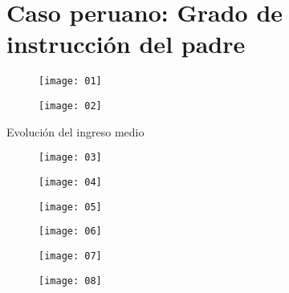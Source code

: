 \documentclass[11.5 pt]{beamer}
\begin{document}
\section{Caso peruano: Grado de instrucción del padre}
\begin{frame}
	\begin{figure}
		\centering
		\texttt{[image: 01]}
	\end{figure}
\end{frame}


\begin{frame}
	\begin{figure}
		\texttt{[image: 02]}
	\end{figure}
\end{frame}


\begin{frame}{Evolución del ingreso medio}
	\begin{figure}
		\centering
		\texttt{[image: 03]}
	\end{figure}
\end{frame}


\begin{frame}
	\begin{figure}
		\texttt{[image: 04]}
	\end{figure}
\end{frame}


\begin{frame}
	\begin{figure}
		\texttt{[image: 05]}
	\end{figure}
\end{frame}


\begin{frame}
	\begin{figure}
		\texttt{[image: 06]}
	\end{figure}
\end{frame}

\begin{frame}
	\begin{figure}
		\texttt{[image: 07]}
	\end{figure}
\end{frame}


\begin{frame}
	\begin{figure}
		\texttt{[image: 08]}
	\end{figure}
\end{frame}
\end{document}
